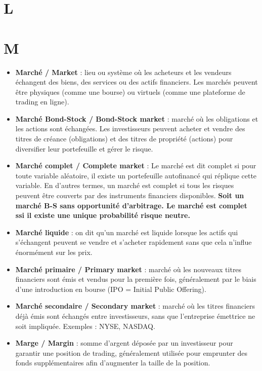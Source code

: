 \documentclass[a4paper,10pt]{article}
\begin{document}
\begin{multicols}{2}
\section*{L}

\section*{M}
\begin{itemize}
  \item \textbf{Marché / Market} : lieu ou système où les acheteurs et les vendeurs échangent des biens, des services ou des actifs financiers. Les marchés peuvent être physiques (comme une bourse) ou virtuels (comme une plateforme de trading en ligne).
  \item \textbf{Marché Bond-Stock / Bond-Stock market} : marché où les obligations et les actions sont échangées. Les investisseurs peuvent acheter et vendre des titres de créance (obligations) et des titres de propriété (actions) pour diversifier leur portefeuille et gérer le risque.
  \item \textbf{Marché complet / Complete market} : Le marché est dit complet si pour toute variable aléatoire, il existe un portefeuille autofinancé qui réplique cette variable. En d’autres termes, un marché est complet si tous les risques peuvent être couverts par des instruments financiers disponibles. \textbf{Soit un marché B-S sans opportunité d'arbitrage. Le marché est complet ssi il existe une unique probabilité risque neutre.}
  \item \textbf{Marché liquide} : on dit qu'un marché est liquide lorsque les actifs qui s'échangent peuvent se vendre et s'acheter rapidement sans que cela n'influe énormément sur les prix.
  \item \textbf{Marché primaire / Primary market} : marché où les nouveaux titres financiers sont émis et vendus pour la première fois, généralement par le biais d’une introduction en bourse (IPO = Initial Public Offering).
  \item \textbf{Marché secondaire / Secondary market} : marché où les titres financiers déjà émis sont échangés entre investisseurs, sans que l’entreprise émettrice ne soit impliquée. Exemples : NYSE, NASDAQ.
  \item \textbf{Marge / Margin} : somme d’argent déposée par un investisseur pour garantir une position de trading, généralement utilisée pour emprunter des fonds supplémentaires afin d’augmenter la taille de la position.

\end{itemize}
\end{multicols}
\end{document}
